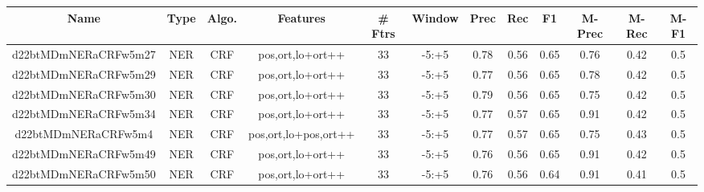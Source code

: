\documentclass[a4paper]{article}
\begin{document}
\begin{landscape}
\begin{center}
\begin{tabular}{ |c|c|c|c|c|c|c|c|c|c|c|c|} 
 \hline
 	Name & Type & Algo. & Features & \# Ftrs & Window & Prec & Rec & F1 & M-Prec & M-Rec & M-F1\\
 \hline

 		

 	
 
 	
 		
 		\small{ d22btMDmNERaCRFw5m27 } & NER & CRF & pos,ort,lo+ort++  &  33 &  -5:+5  &  0.78 & 0.56 & 0.65  &  0.76 & 0.42 & 0.5 \\
 		

 	
 
 	
 		
 		\small{ d22btMDmNERaCRFw5m29 } & NER & CRF & pos,ort,lo+ort++  &  33 &  -5:+5  &  0.77 & 0.56 & 0.65  &  0.78 & 0.42 & 0.5 \\
 		

 	
 
 	
 		
 		\small{ d22btMDmNERaCRFw5m30 } & NER & CRF & pos,ort,lo+ort++  &  33 &  -5:+5  &  0.79 & 0.56 & 0.65  &  0.75 & 0.42 & 0.5 \\
 		

 	
 
 	
 		
 		\small{ d22btMDmNERaCRFw5m34 } & NER & CRF & pos,ort,lo+ort++  &  33 &  -5:+5  &  0.77 & 0.57 & 0.65  &  0.91 & 0.42 & 0.5 \\
 		

 	
 
 	
 		
 		\small{ d22btMDmNERaCRFw5m4 } & NER & CRF & pos,ort,lo+pos,ort++  &  33 &  -5:+5  &  0.77 & 0.57 & 0.65  &  0.75 & 0.43 & 0.5 \\
 		

 	
 
 	
 		
 		\small{ d22btMDmNERaCRFw5m49 } & NER & CRF & pos,ort,lo+ort++  &  33 &  -5:+5  &  0.76 & 0.56 & 0.65  &  0.91 & 0.42 & 0.5 \\
 		

 	
 
 	
 		
 		\small{ d22btMDmNERaCRFw5m50 } & NER & CRF & pos,ort,lo+ort++  &  33 &  -5:+5  &  0.76 & 0.56 & 0.64  &  0.91 & 0.41 & 0.5 \\
 		

 	
 

\end{tabular}
\end{center}
\end{landscape}
\end{document}
